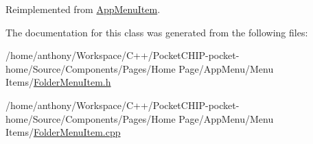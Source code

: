 Reimplemented from \mbox{\hyperlink{classAppMenuItem_a5a156a436279e0319c7960ac2931b14d}{App\+Menu\+Item}}.



The documentation for this class was generated from the following files\+:\begin{DoxyCompactItemize}
\item 
/home/anthony/\+Workspace/\+C++/\+Pocket\+C\+H\+I\+P-\/pocket-\/home/\+Source/\+Components/\+Pages/\+Home Page/\+App\+Menu/\+Menu Items/\mbox{\hyperlink{FolderMenuItem_8h}{Folder\+Menu\+Item.\+h}}\item 
/home/anthony/\+Workspace/\+C++/\+Pocket\+C\+H\+I\+P-\/pocket-\/home/\+Source/\+Components/\+Pages/\+Home Page/\+App\+Menu/\+Menu Items/\mbox{\hyperlink{FolderMenuItem_8cpp}{Folder\+Menu\+Item.\+cpp}}\end{DoxyCompactItemize}
